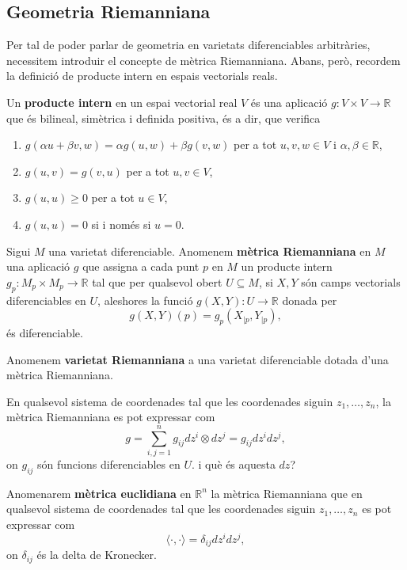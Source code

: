 \subsection{Geometria Riemanniana}
Per tal de poder parlar de geometria en varietats diferenciables arbitràries, necessitem introduir el concepte de mètrica Riemanniana. Abans, però, recordem la definició de producte intern en espais vectorials reals.
\begin{defi}
    Un \textbf{producte intern} en un espai vectorial real $V$ és una aplicació $g:V\times V\to\mathbb R$ que és bilineal, simètrica i definida positiva, és a dir, que verifica
    \begin{enumerate}
        \item $g(\alpha u + \beta v, w) = \alpha g(u,w) + \beta g(v,w)$ per a tot $u,v,w\in V$ i $\alpha,\beta\in\mathbb R$,
        \item $g(u,v) = g(v,u)$ per a tot $u,v\in V$,
        \item $g(u,u)\ge0$ per a tot $u\in V$,
        \item $g(u,u) = 0$ si i només si $u = 0$.
    \end{enumerate}
\end{defi}

\begin{defi}
    Sigui $M$ una varietat diferenciable. Anomenem \textbf{mètrica Riemanniana} en $M$ una aplicació $g$ que assigna a cada punt $p$ en $M$ un producte intern $g_p:M_p\times M_p\to\mathbb R$ tal que per qualsevol obert $U\subseteq M$, si $X,Y$ són camps vectorials diferenciables en $U$, aleshores la funció $g(X,Y):U\to\mathbb R$ donada per
    \begin{equation*}
        g(X,Y)(p) = g_p(X_{|p},Y_{|p}),
    \end{equation*}
    és diferenciable.
    
    Anomenem \textbf{varietat Riemanniana} a una varietat diferenciable dotada d'una mètrica Riemanniana.
\end{defi}
En qualsevol sistema de coordenades tal que les coordenades siguin $z_1,\dots,z_n$, la mètrica Riemanniana es pot expressar com
\begin{equation*}
    g = \sum_{i,j=1}^n g_{ij}dz^i\otimes dz^j = g_{ij}dz^idz^j,
\end{equation*}
on $g_{ij}$ són funcions diferenciables en $U$. {\color{blue} i què és aquesta $dz$?}

\begin{defi}
    Anomenarem \textbf{mètrica euclidiana} en $\mathbb R^n$ la mètrica Riemanniana que en qualsevol sistema de coordenades tal que les coordenades siguin $z_1,\dots,z_n$ es pot expressar com
    \begin{equation*}
        \langle\cdot,\cdot\rangle = \delta_{ij}dz^idz^j,
    \end{equation*}
    on $\delta_{ij}$ és la delta de Kronecker.
\end{defi}


